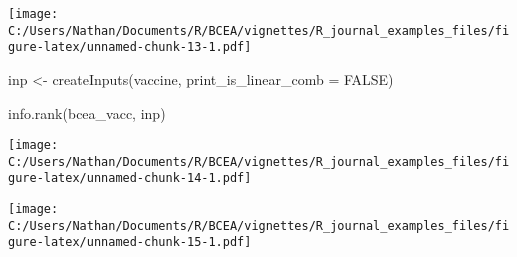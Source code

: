 \documentclass[
]{article}
\newenvironment{Shaded}{\begin{snugshade}}{\end{snugshade}}
\newcommand{\AttributeTok}[1]{\textcolor[rgb]{0.77,0.63,0.00}{#1}}
\newcommand{\CommentTok}[1]{\textcolor[rgb]{0.56,0.35,0.01}{\textit{#1}}}
\newcommand{\ConstantTok}[1]{\textcolor[rgb]{0.00,0.00,0.00}{#1}}
\newcommand{\FunctionTok}[1]{\textcolor[rgb]{0.00,0.00,0.00}{#1}}
\newcommand{\NormalTok}[1]{#1}
\newcommand{\OtherTok}[1]{\textcolor[rgb]{0.56,0.35,0.01}{#1}}
\newcommand{\SpecialCharTok}[1]{\textcolor[rgb]{0.00,0.00,0.00}{#1}}
\newcommand{\StringTok}[1]{\textcolor[rgb]{0.31,0.60,0.02}{#1}}
\begin{document}
\texttt{[image: C:/Users/Nathan/Documents/R/BCEA/vignettes/R\_journal\_examples\_files/figure-latex/unnamed-chunk-13-1.pdf]}

\begin{Shaded}
\begin{Highlighting}[]

\NormalTok{inp }\OtherTok{\textless{}{-}} \FunctionTok{createInputs}\NormalTok{(vaccine, }\AttributeTok{print\_is\_linear\_comb =} \ConstantTok{FALSE}\NormalTok{)}
\end{Highlighting}
\end{Shaded}

\begin{Shaded}
\begin{Highlighting}[]
\FunctionTok{info.rank}\NormalTok{(bcea\_vacc, inp)}
\end{Highlighting}
\end{Shaded}

\texttt{[image: C:/Users/Nathan/Documents/R/BCEA/vignettes/R\_journal\_examples\_files/figure-latex/unnamed-chunk-14-1.pdf]}

\begin{Shaded}
\end{Shaded}

\texttt{[image: C:/Users/Nathan/Documents/R/BCEA/vignettes/R\_journal\_examples\_files/figure-latex/unnamed-chunk-15-1.pdf]}
\end{document}
